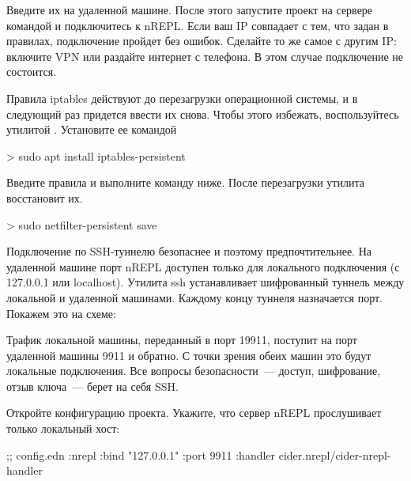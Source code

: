 Введите их на удаленной машине. После этого запустите проект на сервере командой  и подключитесь к nREPL. Если ваш IP совпадает с тем, что задан в правилах, подключение пройдет без ошибок. Сделайте то же самое с другим IP: включите VPN или раздайте интернет с телефона. В этом случае подключение не состоится.

Правила iptables действуют до перезагрузки операционной системы, и в следующий раз придется ввести их снова. Чтобы этого избежать, воспользуйтесь утилитой . Установите ее командой

\begin{english}
  \begin{bash}
> sudo apt install iptables-persistent
  \end{bash}
\end{english}


Введите правила и выполните команду ниже. После перезагрузки утилита восстановит их.

\begin{english}
  \begin{bash}
> sudo netfilter-persistent save
  \end{bash}
\end{english}

Подключение по SSH-туннелю безопаснее и поэтому предпочтительнее. На удаленной машине порт nREPL доступен только для локального подключения (с 127.0.0.1 или localhost). Утилита ssh устанавливает шифрованный туннель между локальной и удаленной машинами. Каждому концу туннеля назначается порт. Покажем это на схеме:

\begin{figure}[H]
  \centering
  
  \label{fig:chart-repl-02}
\end{figure}

Трафик локальной машины, переданный в порт 19911, поступит на порт удаленной машины 9911 и обратно. С точки зрения обеих машин это будут локальные подключения. Все вопросы безопасности~--- доступ, шифрование, отзыв ключа~--- берет на себя SSH.

Откройте конфигурацию проекта. Укажите, что сервер nREPL прослушивает только локальный хост:

\begin{english}
  \begin{clojure}
;; config.edn
{:nrepl
  {:bind "127.0.0.1"
   :port 9911
   :handler cider.nrepl/cider-nrepl-handler}}
  \end{clojure}
\end{english}

